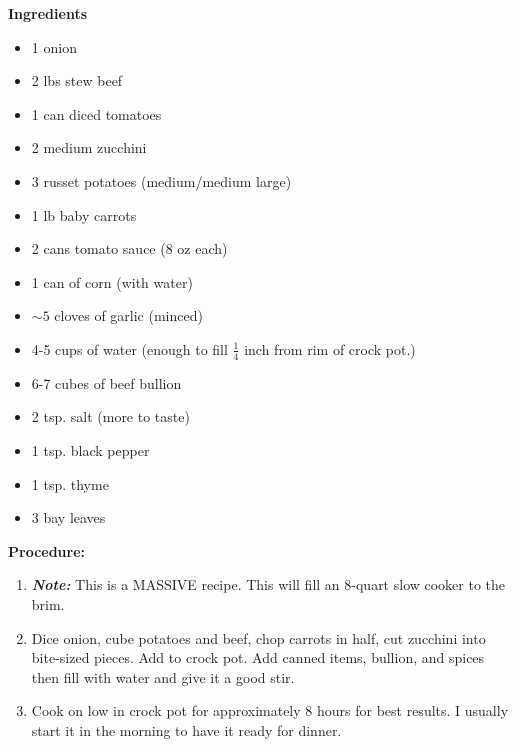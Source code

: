 \begin{multicols}{2}
\textbf{Ingredients}
\begin{itemize}
\item 1 onion 
\item 2 lbs stew beef 
\item 1 can diced tomatoes
\item 2 medium zucchini 
\item 3 russet potatoes (medium/medium large) 
\item 1 lb baby carrots 
\item 2 cans tomato sauce (8 oz each) 
\item 1 can of corn (with water) 
\item $\sim 5$ cloves of garlic (minced)
\item 4-5 cups of water (enough to fill $\frac{1}{4}$ inch from rim of crock pot.)

\item 6-7 cubes of beef bullion 
\item 2 tsp. salt (more to taste) 
\item 1 tsp. black pepper
\item 1 tsp. thyme
\item 3 bay leaves 


\end{itemize}


\columnbreak
\textbf{Procedure:}
\medskip


\begin{enumerate}
\item \textbf{\textit{Note:}} This is a MASSIVE recipe. This will fill an 8-quart slow cooker to the brim. 
\item Dice onion, cube potatoes and beef, chop carrots in half, cut zucchini into bite-sized pieces. Add to crock pot. Add canned items, bullion, and spices then fill with water and give it a good stir. 


\medskip
\item Cook on low in crock pot for approximately 8 hours for best results. I usually start it in the morning to have it ready for dinner. 
  
\end{enumerate}

\end{multicols}




